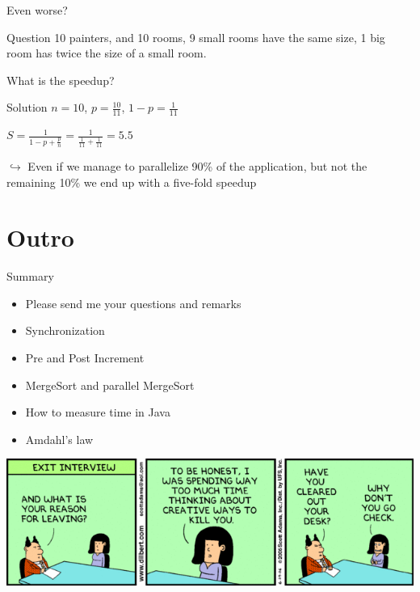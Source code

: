 \begin{frame}{Even worse?}
  \begin{block}{Question}
    10 painters, and 10 rooms, 9 small rooms have the same size, 1 big
    room has twice the size of a small room.

    What is the speedup?
  \end{block}


  \pause

  \begin{exampleblock}{Solution}
    $n = 10$, $p = \frac{10}{11}$, $1 - p = \frac{1}{11}$
    \begin{center}
      \huge
      \begin{math}
        S = \frac{1}{1 - p + \frac{p}{n}} = \frac{1}{\frac{1}{11} +
          \frac{1}{11}} = 5.5
      \end{math}
    \end{center}
    $\hookrightarrow$ Even if we manage to parallelize 90\% of the
    application, but not the remaining 10\% we end up with a five-fold
    speedup
  \end{exampleblock}
\end{frame}


\section*{Outro}

\begin{frame}{Summary}
  \begin{itemize}
  \item Please send me your questions and remarks
  \item Synchronization
  \item Pre and Post Increment
  \item MergeSort and parallel MergeSort
  \item How to measure time in Java
  \item Amdahl's law
  \end{itemize}


  \begin{center}
    \includegraphics[scale=0.35]{figures/dilbert-1}
  \end{center}
\end{frame}



